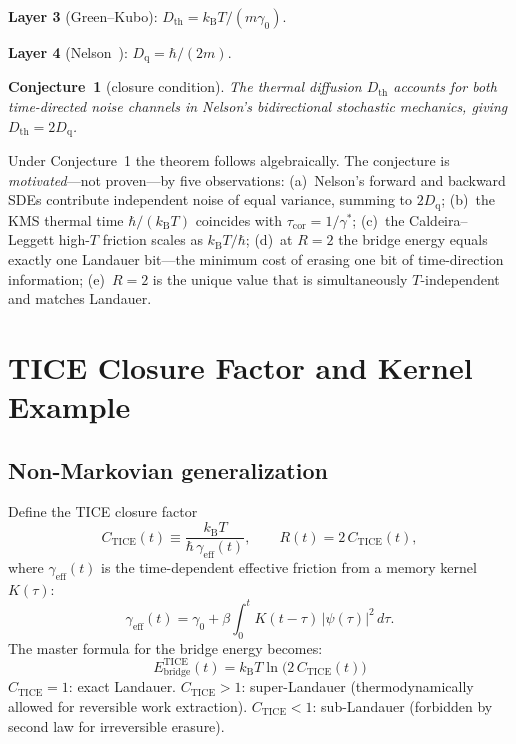 \documentclass[twocolumn,showpacs,preprintnumbers,amsmath,amssymb]{revtex4-2}
\newcommand{\kB}{k_{\mathrm{B}}}
\newcommand{\Dth}{D_{\mathrm{th}}}
\newcommand{\Dq}{D_{\mathrm{q}}}
\newcommand{\geff}{\gamma_{\mathrm{eff}}}
\newcommand{\tcor}{\tau_{\mathrm{cor}}}
\newcommand{\Ebr}{E_{\mathrm{bridge}}}
\newcommand{\CTICE}{C_{\mathrm{TICE}}}
\begin{document}
\noindent\textbf{Layer 3} (Green--Kubo):
$\Dth = \kB T/(m\gamma_0)$.

\noindent\textbf{Layer 4} (Nelson~\cite{Nelson1966}):
$\Dq = \hbar/(2m)$.

\medskip
\noindent\textbf{Conjecture~1} (closure condition).
\textit{The thermal diffusion $\Dth$ accounts for both
time-directed noise channels in Nelson's bidirectional
stochastic mechanics, giving $\Dth = 2\Dq$.}

\medskip
\noindent Under Conjecture~1 the theorem follows algebraically.
The conjecture is \emph{motivated}---not proven---by five
observations:
(a)~Nelson's forward and backward SDEs contribute independent
noise of equal variance, summing to $2\Dq$;
(b)~the KMS thermal time $\hbar/(\kB T)$ coincides with
$\tcor = 1/\gamma^*$;
(c)~the Caldeira--Leggett high-$T$ friction scales as
$\kB T/\hbar$;
(d)~at $R = 2$ the bridge energy equals exactly one Landauer
bit---the minimum cost of erasing one bit of time-direction
information;
(e)~$R = 2$ is the unique value that is simultaneously
$T$-independent and matches Landauer.

\section{TICE Closure Factor and Kernel Example}

\subsection{Non-Markovian generalization}

Define the TICE closure factor
\begin{equation}
  \CTICE(t) \equiv \frac{\kB T}{\hbar\,\geff(t)},
  \qquad
  R(t) = 2\,\CTICE(t),
  \label{eq:CTICE}
\end{equation}
where $\geff(t)$ is the time-dependent effective friction
from a memory kernel $K(\tau)$:
\begin{equation}
  \geff(t) = \gamma_0 + \beta \int_0^t K(t-\tau)\,
  |\psi(\tau)|^2\,d\tau .
  \label{eq:geff}
\end{equation}
The master formula for the bridge energy becomes:
\begin{equation}
  \boxed{
  \Ebr^{\mathrm{TICE}}(t) = \kB T \ln\bigl(2\,\CTICE(t)\bigr)}
  \label{eq:master}
\end{equation}
$\CTICE = 1$: exact Landauer.
$\CTICE > 1$: super-Landauer (thermodynamically allowed
for reversible work extraction).
$\CTICE < 1$: sub-Landauer (forbidden by second law
for irreversible erasure).
\end{document}
